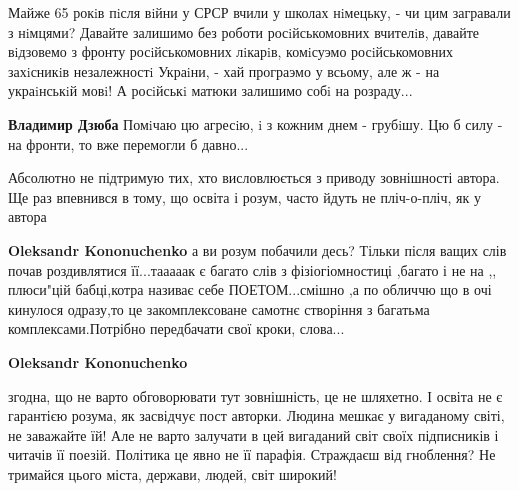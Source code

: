 \begin{itemize}
\begin{itemize}
Майже 65 рокiв пiсля вiйни у СРСР вчили у школах нiмецьку, - чи цим загравали з
нiмцями? Давайте залишимо без роботи росiйськомовних вчителiв, давайте
вiдзовемо з фронту росiйськомовних лiкарiв, комiсуэмо росiйськомовних
захiсникiв незалежностi Украiни, - хай програэмо у всьому, але ж - на
украiнськiй мовi! А росiйськi матюки залишимо собi на розраду...


\textbf{Владимир Дзюба} Помiчаю цю агресiю, i з кожним днем - грубiшу. Цю б силу - на фронти, то вже перемогли б давно...
\end{itemize}


Абсолютно не підтримую тих, хто висловлюється з приводу зовнішності автора. Ще
раз впевнився в тому, що освіта і розум, часто йдуть не пліч-о-пліч, як у
автора

\begin{itemize}

\textbf{Oleksandr Kononuchenko} а ви розум побачили десь? Тільки після ващих слів почав роздивлятися її...тааааак є багато слів з фізіогіомностиці ,багато і не на ,, плюси"цій бабці,котра називає себе ПОЕТОМ...смішно ,а по обличчю що в очі кинулося одразу,то це закомплексоване самотнє створіння з багатьма комплексами.Потрібно передбачати свої кроки, слова...


\textbf{Oleksandr Kononuchenko} 

згодна, що не варто обговорювати тут
зовнішність, це не шляхетно. І освіта не є гарантією розума, як засвідчує пост
авторки. Людина мешкає у вигаданому світі, не заважайте їй! Але не варто
залучати в цей вигаданий світ своїх підписників і читачів її поезій. Політика
це явно не її парафія. Страждаєш від гноблення? Не тримайся цього міста,
держави, людей, світ широкий!




\end{itemize}
\end{itemize}
